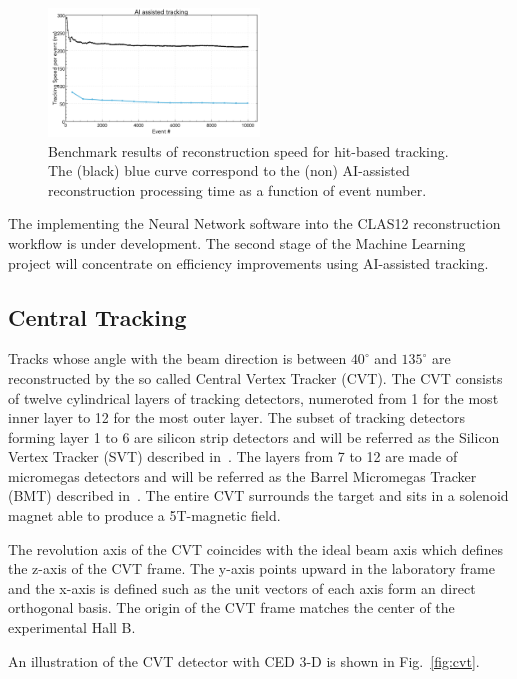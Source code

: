 \begin{figure}
\centering
\includegraphics[width=0.5\textwidth]{pics/nn2.png}
\caption{Benchmark results of reconstruction speed for hit-based tracking.  
The (black) blue curve correspond to the (non) AI-assisted reconstruction processing time as a function of event number. 
}
\label{fig:nn2}
\end{figure}

The implementing the Neural Network software into the CLAS12 reconstruction workflow is under development. The second stage of the Machine Learning project will concentrate on efficiency improvements using AI-assisted tracking.

\subsection{Central Tracking}\label{sec:cvt}

Tracks whose angle with the beam direction is between $40^\circ$ and $135^\circ$ are reconstructed by the so called
Central Vertex Tracker (CVT). The CVT consists of twelve cylindrical layers of tracking detectors, numeroted from 1 for
the most inner layer to 12 for the most outer layer. The subset of tracking detectors forming layer 1 to 6 are silicon
strip detectors and will be referred as the Silicon Vertex Tracker (SVT) described in~\cite{svt-nim}. The layers from 7
to 12 are made of micromegas detectors and will be referred as the Barrel Micromegas Tracker (BMT) described
in~\cite{mm-nim}. The entire CVT surrounds the target and sits in a solenoid magnet able to produce a 5T-magnetic
field.

The revolution axis of the CVT coincides with the ideal beam axis which defines the z-axis of the CVT frame. The y-axis
points upward in the laboratory frame and the x-axis is defined such as the unit vectors of each axis form an direct
orthogonal basis. The origin of the CVT frame matches the center of the experimental Hall B.

An illustration of the CVT detector with CED 3-D is shown in Fig.~\ref{fig:cvt}.

